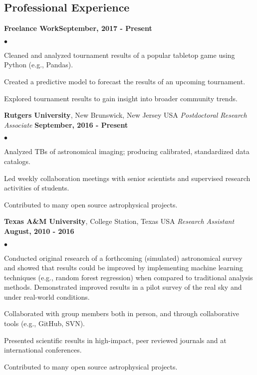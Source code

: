 \documentclass[margin,line, 11pt]{res}
\newenvironment{list2}{
  \begin{list}{$\bullet$}{%
      \setlength{\itemsep}{0in}
      \setlength{\parsep}{0in} \setlength{\parskip}{0in}
      \setlength{\topsep}{0in} \setlength{\partopsep}{0in} 
      \setlength{\leftmargin}{0.2in}}}{\end{list}}
\begin{document}
\begin{resume}
\section{Professional \newline Experience}
\textbf{Freelance Work}\hfill \textbf{September, 2017 - Present}\newline
    \begin{list2}
    	\vspace*{-5mm}
    	\item Cleaned and analyzed tournament results of a popular tabletop game using Python (e.g., Pandas).
    	\item Created a predictive model to forecast the results of an upcoming tournament.
    	\item Explored tournament results to gain insight into broader community trends.
    \end{list2}
    \vspace*{-4mm}
    
\textbf{Rutgers University}, New Brunswick, New Jersey USA \newline
\textit{Postdoctoral Research Associate} \hfill \textbf{September, 2016 - Present}\newline
    \begin{list2}
    	\vspace*{-5mm}
    	\item Analyzed TBs of astronomical imaging; producing calibrated, standardized data catalogs.
    	\item Led weekly collaboration meetings with senior scientists and supervised research activities of students.  
    	\item Contributed to many open source astrophysical projects.
    \end{list2}
\vspace*{-4mm}

\textbf{Texas A\&M University}, College Station, Texas USA\newline
\textit{Research Assistant} \hfill \textbf{August, 2010 - 2016}\newline
    \begin{list2}
    	\vspace*{-5mm}
    	\item Conducted original research of a forthcoming (simulated) astronomical survey and showed that results could be improved by implementing machine learning techniques (e.g., random forest regression) when compared to traditional analysis methods. Demonstrated improved results in a pilot survey of the real sky and under real-world conditions.    
    	\item Collaborated with group members both in person, and through collaborative tools (e.g., GitHub, SVN).
    	\item Presented scientific results in high-impact, peer reviewed journals and at international conferences.
    	\item Contributed to many open source astrophysical projects.
    \end{list2}
\vspace*{-4mm}


\end{resume}
\end{document}
